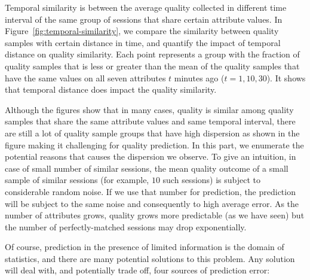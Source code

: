 { Temporal similarity is between the average quality collected in different time interval of the same group of sessions that share certain attribute values. In Figure~\ref{fig:temporal-similarity}, we compare the similarity between quality samples with certain distance in time, and quantify the impact of temporal distance on quality similarity. Each point represents a group with the fraction of quality samples that is less or greater than the mean of the quality samples that have the same values on all seven attributes $t$ minutes ago ($t=1,10,30$). It shows that temporal distance does impact the quality similarity. 

}

Although the figures show that in many cases, quality is similar among quality samples that share the same attribute values and same temporal interval, there are still a lot of quality sample groups that have high dispersion as shown in the figure making it challenging for quality prediction. 
In this part, we enumerate the potential reasons that causes the dispersion we observe. To give an intuition, in case of small number of similar sessions, the mean quality outcome of a small sample of similar sessions (for example, $10$ such sessions) is subject to considerable random noise.  If we use that number for prediction, the prediction will be subject to the same noise and consequently to high average error.  As the number of attributes grows, quality grows more predictable (as we have seen) but the number of perfectly-matched sessions may drop exponentially.

Of course, prediction in the presence of limited information is the domain of statistics, and there are many potential solutions to this problem.  Any solution will deal with, and potentially trade off, four sources of prediction error:

